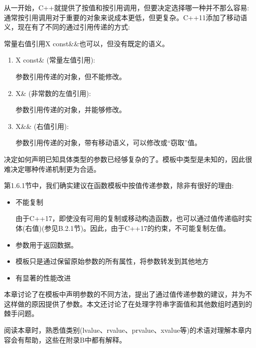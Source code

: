 从一开始，C++就提供了按值和按引用调用，但要决定选择哪一种并不那么容易:通常按引用调用对于重要的对象来说成本更低，但更复杂。C++11添加了移动语义，现在有了不同的通过引用传递的方式:

\begin{notice}常量右值引用X const\&\&也可以，但没有既定的语义。
\end{notice}

\begin{enumerate}
\item 
X const\& (常量左值引用):

参数引用传递的对象，但不能修改。

\item 
X\& (非常数的左值引用):

参数引用传递的对象，并能够修改。

\item 
X\&\& (右值引用):

参数引用传递的对象，带有移动语义，可以修改或“窃取”值。
\end{enumerate}

决定如何声明已知具体类型的参数已经够复杂的了。模板中类型是未知的，因此很难决定哪种传递机制更为合适。

第1.6.1节中，我们确实建议在函数模板中按值传递参数，除非有很好的理由:

\begin{itemize}
\item 
不能复制

\begin{notice}由于C++17，即使没有可用的复制或移动构造函数，也可以通过值传递临时实体(右值)(参见B.2.1节)。因此，由于C++17的约束，不可能复制左值。
\end{notice}

\item 
参数用于返回数据。

\item 
模板只是通过保留原始参数的所有属性，将参数转发到其他地方

\item 
有显著的性能改进
\end{itemize}

本章讨论了在模板中声明参数的不同方法，提出了通过值传递参数的建议，并为不这样做的原因提供了参数。本文还讨论了在处理字符串字面值和其他数组时遇到的棘手问题。

阅读本章时，熟悉值类别(lvalue、rvalue、prvalue、xvalue等)的术语对理解本章内容会有帮助，这些在附录B中都有解释。





























